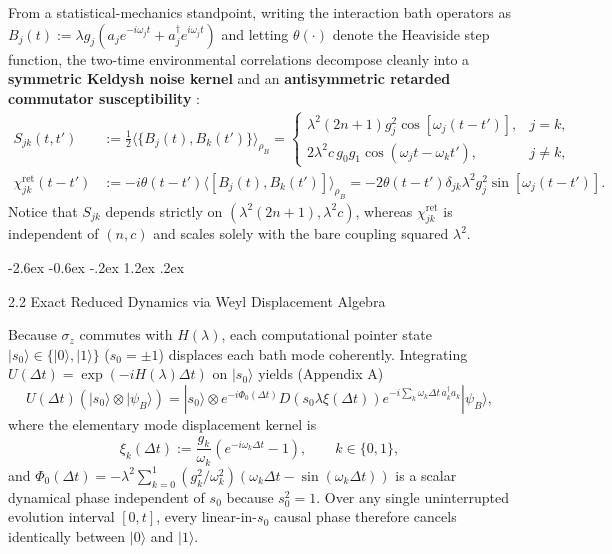 \documentclass[11pt,letterpaper]{article}
\makeatletter
\renewcommand\subsection{\@startsection{subsection}{2}{\z@}%
  {-2.6ex \@plus -0.6ex \@minus -.2ex}%
  {1.2ex \@plus .2ex}%
  {\normalfont\large\bfseries\raggedright\hyphenpenalty=10000}}
\theoremstyle{definition}
\makeatother
\begin{document}
From a statistical-mechanics standpoint, writing the interaction bath
operators as
\(B_j(t) := \lambda g_j (a_j e^{-i\omega_j t} + a_j^\dagger e^{i\omega_j t})\)
and letting \(\theta(\cdot)\) denote the Heaviside step function, the
two-time environmental correlations decompose cleanly into a
\textbf{symmetric Keldysh noise kernel} and an \textbf{antisymmetric
retarded commutator susceptibility} \citep{huPazZhang1992, clerk2010}:
\[\begin{aligned}
S_{jk}(t, t') &:= \frac{1}{2}\langle\{B_j(t), B_k(t')\}\rangle_{\rho_B} = \begin{cases} \lambda^2 (2n + 1) g_j^2 \cos[\omega_j(t - t')], & j = k, \\ 2\lambda^2 c\, g_0 g_1 \cos(\omega_j t - \omega_k t'), & j \neq k, \end{cases} \\
\chi_{jk}^{\mathrm{ret}}(t - t') &:= -i\theta(t - t')\langle[B_j(t), B_k(t')]\rangle_{\rho_B} = -2\theta(t - t')\delta_{jk} \lambda^2 g_j^2 \sin[\omega_j(t - t')].
\end{aligned}\] Notice that \(S_{jk}\) depends strictly on
\((\lambda^2(2n+1), \lambda^2 c)\), whereas \(\chi_{jk}^{\mathrm{ret}}\)
is independent of \((n, c)\) and scales solely with the bare coupling
squared \(\lambda^2\).

\subsection{2.2 Exact Reduced Dynamics via Weyl Displacement
Algebra}\label{exact-reduced-dynamics-via-weyl-displacement-algebra}

Because \(\sigma_z\) commutes with \(H(\lambda)\), each computational
pointer state \(|s_0\rangle \in \{|0\rangle, |1\rangle\}\)
(\(s_0 = \pm 1\)) displaces each bath mode coherently. Integrating
\(U(\Delta t) = \exp(-i H(\lambda) \Delta t)\) on \(|s_0\rangle\) yields
(Appendix A)
\[U(\Delta t)\left(|s_0\rangle \otimes |\psi_B\rangle\right) = |s_0\rangle \otimes e^{-i\Phi_0(\Delta t)} D\!\left(s_0 \lambda \xi(\Delta t)\right) e^{-i\sum_k \omega_k \Delta t\, a_k^\dagger a_k}|\psi_B\rangle,
\tag{5}\] where the elementary mode displacement kernel is
\[\xi_k(\Delta t) := \frac{g_k}{\omega_k}\left(e^{-i\omega_k \Delta t} - 1\right), \qquad k \in \{0, 1\},
\tag{6}\] and
\(\Phi_0(\Delta t) = -\lambda^2 \sum_{k=0}^1 (g_k^2/\omega_k^2)(\omega_k\Delta t - \sin(\omega_k\Delta t))\)
is a scalar dynamical phase independent of \(s_0\) because
\(s_0^2 = 1\). Over any single uninterrupted evolution interval
\([0, t]\), every linear-in-\(s_0\) causal phase therefore cancels
identically between \(|0\rangle\) and \(|1\rangle\).
\end{document}
